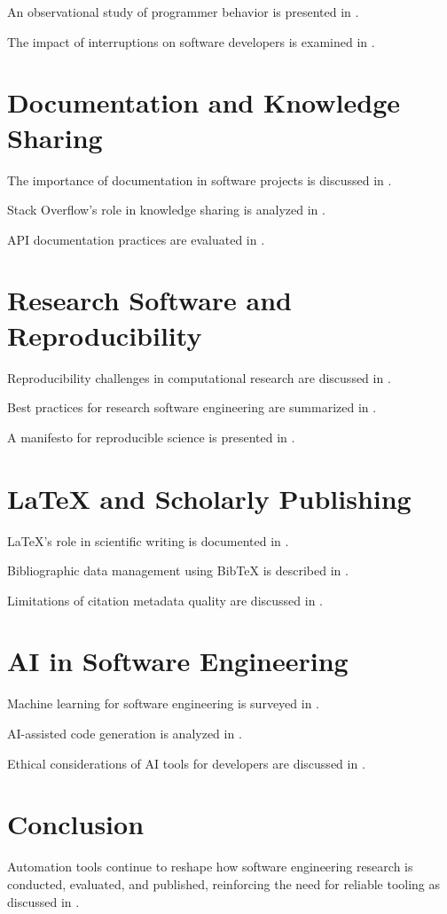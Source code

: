 \documentclass[12pt]{article}
\begin{document}
An observational study of programmer behavior is presented in \cite{Zhang2020retrievalb}.

The impact of interruptions on software developers is examined in .

\section{Documentation and Knowledge Sharing}
The importance of documentation in software projects is discussed in .

Stack Overflow’s role in knowledge sharing is analyzed in .

API documentation practices are evaluated in \cite{Svajlenko2015evaluating}.

\section{Research Software and Reproducibility}
Reproducibility challenges in computational research are discussed in \cite{Peng2011reproducib}.

Best practices for research software engineering are summarized in \cite{Kaya2021learningmu}.

A manifesto for reproducible science is presented in \cite{Baker20161500scient}.

\section{LaTeX and Scholarly Publishing}
LaTeX’s role in scientific writing is documented in .

Bibliographic data management using BibTeX is described in \cite{Cheng1978generating}.

Limitations of citation metadata quality are discussed in \cite{Chodpathumwan2021structural}.

\section{AI in Software Engineering}
Machine learning for software engineering is surveyed in \cite{Allamanis2017asurveyofm}.

AI-assisted code generation is analyzed in \cite{Chen2021evaluating}.

Ethical considerations of AI tools for developers are discussed in \cite{Bender2021onthedange}.

\section{Conclusion}
Automation tools continue to reshape how software engineering research is conducted, evaluated, and published, reinforcing the need for reliable tooling as discussed in \cite{Guizzo2020costmeasur}.
\end{document}
